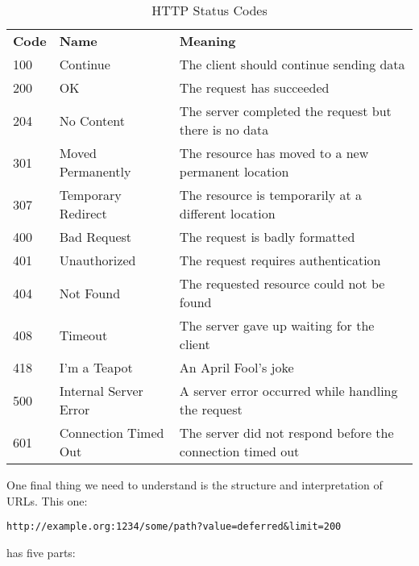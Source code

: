 \begin{table}
\begin{tabular}{llp{}}
\textbf{Code} & \textbf{Name}                  & \textbf{Meaning} \\
100  & Continue              & The client should continue sending data \\
200  & OK                    & The request has succeeded \\
204  & No Content            & The server completed the request but there is no data \\
301  & Moved Permanently     & The resource has moved to a new permanent location \\
307  & Temporary Redirect    & The resource is temporarily at a different location \\
400  & Bad Request           & The request is badly formatted \\
401  & Unauthorized          & The request requires authentication \\
404  & Not Found             & The requested resource could not be found \\
408  & Timeout               & The server gave up waiting for the client \\
418  & I'm a Teapot          & An April Fool's joke \\
500  & Internal Server Error & A server error occurred while handling the request \\
601  & Connection Timed Out  & The server did not respond before the connection timed out
\end{tabular}
\caption{HTTP Status Codes}
\label{t:server-codes}
\end{table}

One final thing we need to understand is the structure and interpretation of URLs.
This one:

\begin{verbatim}
http://example.org:1234/some/path?value=deferred&limit=200
\end{verbatim}

\noindent
has five parts:

